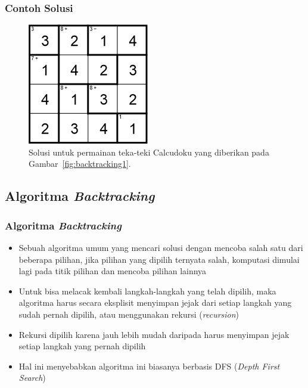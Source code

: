 \documentclass{beamer}
\begin{document}
\begin{frame}
\frametitle{Contoh Solusi}
\begin{figure}
\centering
\captionsetup{justification=centering}
\includegraphics[scale=1]{Gambar/Backtracking2}
\caption[Solusi untuk permainan teka-teki Calcudoku yang diberikan pada Gambar~\ref{fig:backtracking1} ]{Solusi untuk permainan teka-teki Calcudoku yang diberikan pada Gambar~\ref{fig:backtracking1}. }
\label{fig:backtracking2}
\end{figure}
\end{frame}

\subsection{Algoritma \protect\textit{Backtracking}}

\begin{frame}
\frametitle{Algoritma \protect\textit{Backtracking}}
\begin{itemize}
\item Sebuah algoritma umum yang mencari solusi dengan mencoba salah satu dari beberapa pilihan, jika pilihan yang dipilih ternyata salah, komputasi dimulai lagi pada titik pilihan dan mencoba pilihan lainnya
\item Untuk bisa melacak kembali langkah-langkah yang telah dipilih, maka algoritma harus secara eksplisit menyimpan jejak dari setiap langkah yang sudah pernah dipilih, atau menggunakan rekursi (\textit{recursion})
\item Rekursi dipilih karena jauh lebih mudah daripada harus menyimpan jejak setiap langkah yang pernah dipilih
\item Hal ini menyebabkan algoritma ini biasanya berbasis DFS (\textit{Depth First Search})
\end{itemize}
\end{frame}

\end{document}
